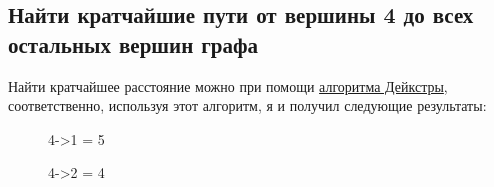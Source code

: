 \documentclass{article}
\begin{document}
        \subsection{Найти кратчайшие пути от вершины 4 до всех остальных вершин графа}
            Найти кратчайшее расстояние можно при помощи \href{https://ru.wikipedia.org/wiki/%D0%90%D0%BB%D0%B3%D0%BE%D1%80%D0%B8%D1%82%D0%BC_%D0%94%D0%B5%D0%B9%D0%BA%D1%81%D1%82%D1%80%D1%8B}{алгоритма Дейкстры}, соответственно, используя этот алгоритм, я и получил следующие результаты:
            \begin{figure}[h!]
                \begin{center}
                    \begin{minipage}[h]{0.2\linewidth}
                        \caption*{4->1 = 5}
                    \end{minipage}
                    \begin{minipage}[h]{0.2\linewidth}
                        \caption*{4->2 = 4}
                    \end{minipage}

\end{center}
\end{figure}
\end{document}
